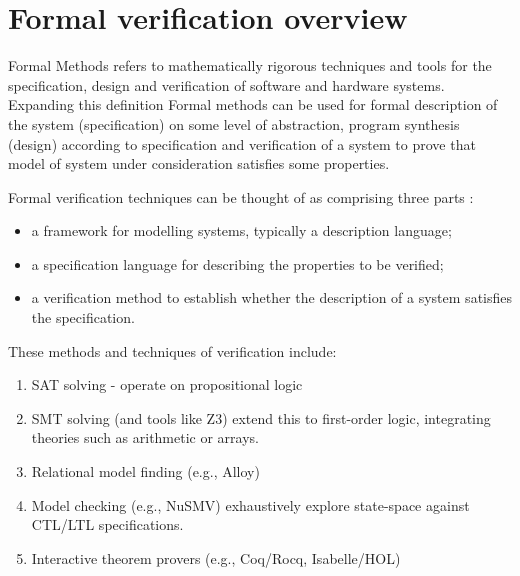 \section {Formal verification overview}
Formal Methods refers to mathematically rigorous techniques and
tools for the specification, design and verification of software and
hardware systems.\\ 
Expanding this definition Formal methods 
can be used for formal description of the system (specification) 
on some level of abstraction, program synthesis (design) according to specification
and verification of a system to prove that model of system under consideration 
satisfies some properties.


Formal verification techniques can be thought of as comprising three parts \cite{HuthR1}:
\begin{itemize}
    \item a framework for modelling systems, typically a description language;
    \item a specification language for describing the properties to be verified;
    \item a verification method to establish whether the description of a system satisfies the specification.
\end{itemize}
These methods and techniques of verification include:
\begin{enumerate}

    \item SAT solving - operate on propositional logic 

    \item SMT solving (and tools like Z3) extend this to first-order logic,
        integrating theories such as arithmetic or arrays.

    \item Relational model finding (e.g., Alloy) 

    \item Model checking (e.g., NuSMV) exhaustively explore state-space against CTL/LTL specifications.

    \item Interactive theorem provers (e.g., Coq/Rocq, Isabelle/HOL) 
\end{enumerate}


